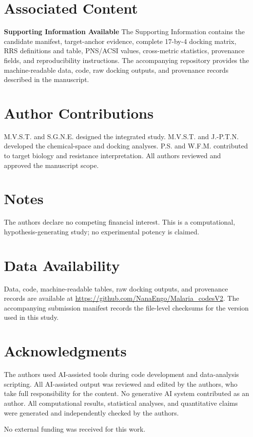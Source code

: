 \documentclass[journal=jcisd8,manuscript=article]{achemso}
\begin{document}
\section*{Associated Content}
\textbf{Supporting Information Available}
The Supporting Information contains the candidate manifest, target-anchor evidence, complete 17-by-4 docking matrix, RRS definitions and table, PNS/ACSI values, cross-metric statistics, provenance fields, and reproducibility instructions. The accompanying repository provides the machine-readable data, code, raw docking outputs, and provenance records described in the manuscript.

\section*{Author Contributions}
M.V.S.T. and S.G.N.E. designed the integrated study. M.V.S.T. and J.-P.T.N. developed the chemical-space and docking analyses. P.S. and W.F.M. contributed to target biology and resistance interpretation. All authors reviewed and approved the manuscript scope.

\section*{Notes}
The authors declare no competing financial interest. This is a computational, hypothesis-generating study; no experimental potency is claimed.

\section*{Data Availability}
Data, code, machine-readable tables, raw docking outputs, and provenance records are available at \url{https://github.com/NanaEngo/Malaria_codesV2}. The accompanying submission manifest records the file-level checksums for the version used in this study.

\section*{Acknowledgments}
The authors used AI-assisted tools during code development and data-analysis scripting. All AI-assisted output was reviewed and edited by the authors, who take full responsibility for the content. No generative AI system contributed as an author. All computational results, statistical analyses, and quantitative claims were generated and independently checked by the authors.



\begin{acknowledgement}
No external funding was received for this work.
\end{acknowledgement}
\end{document}
